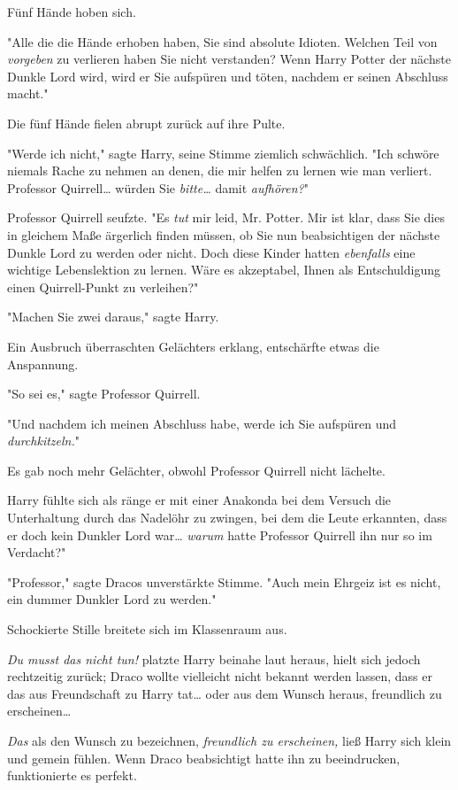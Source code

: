 {Fünf Hände hoben sich.

"Alle die die Hände erhoben haben, Sie sind absolute Idioten. Welchen Teil von \emph{vorgeben} zu verlieren haben Sie nicht verstanden? Wenn Harry Potter der nächste Dunkle Lord wird, wird er Sie aufspüren und töten, nachdem er seinen Abschluss macht."

Die fünf Hände fielen abrupt zurück auf ihre Pulte.

"Werde ich nicht," sagte Harry, seine Stimme ziemlich schwächlich. "Ich schwöre niemals Rache zu nehmen an denen, die mir helfen zu lernen wie man verliert. Professor Quirrell… würden Sie \emph{bitte…} damit \emph{aufhören?}"

Professor Quirrell seufzte. "Es \emph{tut} mir leid, Mr. Potter. Mir ist klar, dass Sie dies in gleichem Maße ärgerlich finden müssen, ob Sie nun beabsichtigen der nächste Dunkle Lord zu werden oder nicht. Doch diese Kinder hatten \emph{ebenfalls} eine wichtige Lebenslektion zu lernen. Wäre es akzeptabel, Ihnen als Entschuldigung einen Quirrell-Punkt zu verleihen?"

"Machen Sie zwei daraus," sagte Harry.

Ein Ausbruch überraschten Gelächters erklang, entschärfte etwas die Anspannung.

"So sei es," sagte Professor Quirrell.

"Und nachdem ich meinen Abschluss habe, werde ich Sie aufspüren und \emph{durchkitzeln.}"

Es gab noch mehr Gelächter, obwohl Professor Quirrell nicht lächelte.

Harry fühlte sich als ränge er mit einer Anakonda bei dem Versuch die Unterhaltung durch das Nadelöhr zu zwingen, bei dem die Leute erkannten, dass er doch kein Dunkler Lord war… \emph{warum} hatte Professor Quirrell ihn nur so im Verdacht?"

"Professor," sagte Dracos unverstärkte Stimme. "Auch mein Ehrgeiz ist es nicht, ein dummer Dunkler Lord zu werden."

Schockierte Stille breitete sich im Klassenraum aus.

\emph{Du musst das nicht tun!} platzte Harry beinahe laut heraus, hielt sich jedoch rechtzeitig zurück; Draco wollte vielleicht nicht bekannt werden lassen, dass er das aus Freundschaft zu Harry tat… oder aus dem Wunsch heraus, freundlich zu erscheinen…

\emph{Das} als den Wunsch zu bezeichnen, \emph{freundlich zu erscheinen,} ließ Harry sich klein und gemein fühlen. Wenn Draco beabsichtigt hatte ihn zu beeindrucken, funktionierte es perfekt.

}
